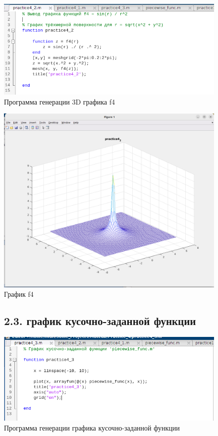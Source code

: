 \documentclass[12pt]{article}
\begin{document}
\begin{figure}[!h]
	\centering
	\includegraphics[width=\linewidth]{3d_plot.png}
	\caption{Программа генерации 3D графика f4}
\end{figure}

\begin{figure}[!h]
	\centering
	\includegraphics[width=\linewidth]{3d_plot_plot.png}
	\caption{График f4}
\end{figure}
 
 
\begin{figure}[!h]
 \subsection*{2.3. график кусочно-заданной функции} 
\end{figure}
 
\begin{figure}[!h]
	\centering
	\includegraphics[width=\linewidth]{piecewise_setup.png}
	\caption{Программа генерации графика кусочно-заданной функции}
\end{figure}
\end{document}

